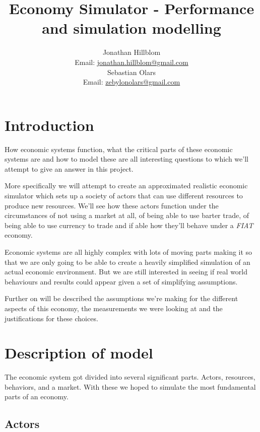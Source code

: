 \documentclass[11p]{article}
\begin{document}
\title{Economy Simulator - Performance and simulation modelling}
\author{Jonathan Hillblom \\ Email: \href{mailto:jonathan.hillblom@gmail.com}{jonathan.hillblom@gmail.com}
\\
Sebastian Olars \\ Email: \href{mailto: zebylonolars@gmail.com}{zebylonolars@gmail.com}}
\maketitle
\section{Introduction}

How economic systems function, what the critical parts of these economic systems are and how to model these are all interesting questions to which we'll attempt to give an answer in this project.

More specifically we will attempt to create an approximated realistic economic simulator which sets up a society of actors that can use different resources to produce new resources. We'll see how these actors function under the circumstances of not using a market at all, of being able to use barter trade, of being able to use currency to trade and if able how they'll behave under a \textit{FIAT} economy.

Economic systems are all highly complex with lots of moving parts making it so that we are only going to be able to create a heavily simplified simulation of an actual economic environment. But we are still interested in seeing if real world behaviours and results could appear given a set of simplifying assumptions.

Further on will be described the assumptions we're making for the different aspects of this economy, the measurements we were looking at and the justifications for these choices.

\section{Description of model}
The economic system got divided into several significant parts. Actors, resources, behaviors, and a market. With these we hoped to simulate the most fundamental parts of an economy.

\subsection{Actors}
\end{document}
